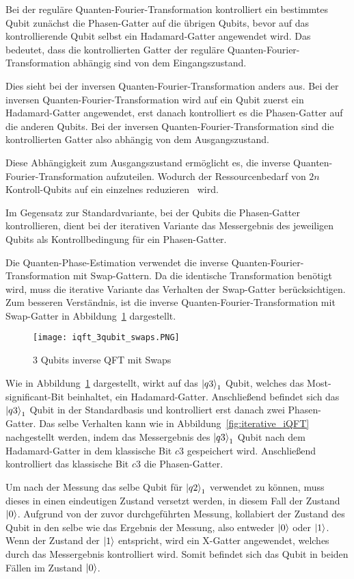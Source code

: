Bei der reguläre Quanten-Fourier-Transformation kontrolliert ein bestimmtes Qubit zunächst die Phasen-Gatter auf die übrigen Qubits, 
bevor auf das kontrollierende Qubit selbst ein Hadamard-Gatter angewendet wird.
Das bedeutet, dass die kontrollierten Gatter der reguläre Quanten-Fourier-Transformation abhängig sind von dem Eingangszustand.

Dies sieht bei der inversen Quanten-Fourier-Transformation anders aus.
Bei der inversen Quanten-Fourier-Transformation wird auf ein Qubit zuerst ein Hadamard-Gatter angewendet, 
erst danach kontrolliert es die Phasen-Gatter auf die anderen Qubits.
Bei der inversen Quanten-Fourier-Transformation sind die kontrollierten Gatter also abhängig von dem Ausgangszustand.

Diese Abhängigkeit zum Ausgangszustand ermöglicht es, 
die inverse Quanten-Fourier-Transformation aufzuteilen.
Wodurch der Ressourcenbedarf von \(2n\) Kontroll-Qubits auf ein einzelnes reduzieren~\cite{Parker2000} wird.

Im Gegensatz zur Standardvariante, bei der Qubits die Phasen-Gatter kontrollieren, 
dient bei der iterativen Variante das Messergebnis des jeweiligen Qubits als Kontrollbedingung für ein Phasen-Gatter.

Die Quanten-Phase-Estimation verwendet die inverse Quanten-Fourier-Transformation mit Swap-Gattern.
Da die identische Transformation benötigt wird, 
muss die iterative Variante das Verhalten der Swap-Gatter berücksichtigen.
Zum besseren Verständnis, 
ist die inverse Quanten-Fourier-Transformation mit Swap-Gatter in Abbildung~\ref{fig:iQFTswaps} dargestellt.
\begin{figure} [H]
  \caption{3 Qubits inverse QFT mit Swaps}
  \label{fig:iQFTswaps}
  \texttt{[image: iqft\_3qubit\_swaps.PNG]}
  \centering
  \end{figure}
Wie in Abbildung~\ref{fig:iQFTswaps} dargestellt, 
wirkt auf das \(\ket{q3}_1\) Qubit, welches das Most-significant-Bit beinhaltet, 
ein Hadamard-Gatter. 
Anschließend befindet sich das \(\ket{q3}_1\) Qubit in der Standardbasis und kontrolliert erst danach zwei Phasen-Gatter.
Das selbe Verhalten kann wie in Abbildung~\ref{fig:iterative_iQFT} nachgestellt werden, 
indem das Messergebnis des \(\ket{q3}_1\) Qubit nach dem Hadamard-Gatter in dem klassische Bit \(c3\) gespeichert wird.
Anschließend kontrolliert das klassische Bit \(c3\) die Phasen-Gatter.

Um nach der Messung das selbe Qubit für \(\ket{q2}_1\) verwendet zu können, 
muss dieses in einen eindeutigen Zustand versetzt werden, 
in diesem Fall der Zustand \(\ket{0}\).
Aufgrund von der zuvor durchgeführten Messung, 
kollabiert der Zustand des Qubit in den selbe wie das Ergebnis der Messung, 
also entweder \(\ket{0}\) oder \(\ket{1}\).
Wenn der Zustand der \(\ket{1}\) entspricht, 
wird ein X-Gatter angewendet, 
welches durch das Messergebnis kontrolliert wird. 
Somit befindet sich das Qubit in beiden Fällen im Zustand \(\ket{0}\).

